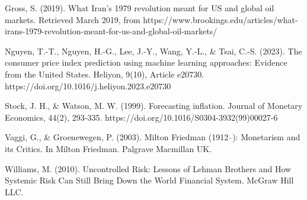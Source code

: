 \documentclass[
  man,floatsintext,
  man]{apa6}
\begin{document}
\begin{hangparas}{4em}{1}
\noindent Gross, S. (2019). What Iran's 1979 revolution meant for US and global oil markets. Retrieved March 2019, from https://www.brookings.edu/articles/what-irans-1979-revolution-meant-for-us-and-global-oil-markets/ \newline
\end{hangparas}

\begin{hangparas}{4em}{1}
\noindent Nguyen, T.-T., Nguyen, H.-G., Lee, J.-Y., Wang, Y.-L., \& Tsai, C.-S. (2023). The consumer price index prediction using machine learning approaches: Evidence from the United States. Heliyon, 9(10), Article e20730. https://doi.org/10.1016/j.heliyon.2023.e20730 \newline
\end{hangparas}

\begin{hangparas}{4em}{1}
\noindent Stock, J. H., \& Watson, M. W. (1999). Forecasting inflation. Journal of Monetary Economics, 44(2), 293-335. https://doi.org/10.1016/S0304-3932(99)00027-6 \newline
\end{hangparas}

\begin{hangparas}{4em}{1}
\noindent Vaggi, G., \& Groenewegen, P. (2003). Milton Friedman (1912--): Monetarism and its Critics. In Milton Friedman. Palgrave Macmillan UK.\newline
\end{hangparas}

\begin{hangparas}{4em}{1}
\noindent Williams, M. (2010). Uncontrolled Risk: Lessons of Lehman Brothers and How Systemic Risk Can Still Bring Down the World Financial System. McGraw Hill LLC.\newline
\end{hangparas}


\printbibliography
\end{document}
